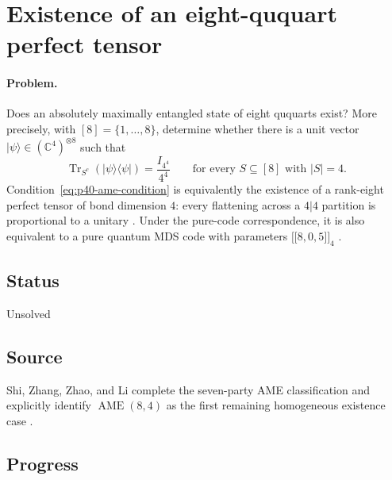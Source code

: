 \section{Existence of an eight-ququart perfect tensor}
\label{sec:problem-40}

\paragraph{Problem.}
Does an absolutely maximally entangled state of eight ququarts exist?  More
precisely, with $[8]=\{1,\ldots,8\}$, determine whether there is a unit vector
$|\psi\rangle\in(\mathbb{C}^{4})^{\otimes 8}$ such that
\begin{equation}
  \operatorname{Tr}_{S^{c}}\!\left(|\psi\rangle\!\langle\psi|\right)
  =\frac{I_{4^{4}}}{4^{4}}
  \qquad\text{for every }S\subseteq[8]\text{ with }|S|=4.
  \label{eq:p40-ame-condition}
\end{equation}
Condition~\eqref{eq:p40-ame-condition} is equivalently the existence of a
rank-eight perfect tensor of bond dimension $4$: every flattening across a
$4|4$ partition is proportional to a unitary
.  Under the pure-code correspondence,
it is also equivalent to a pure quantum MDS code with parameters
$\bigl[\!\bigl[8,0,5\bigr]\!\bigr]_{4}$
.

\subsection*{Status}

Unsolved

\subsection*{Source}

Shi, Zhang, Zhao, and Li complete the seven-party AME classification and
explicitly identify $\operatorname{AME}(8,4)$ as the first remaining
homogeneous existence case .

\subsection*{Progress}

